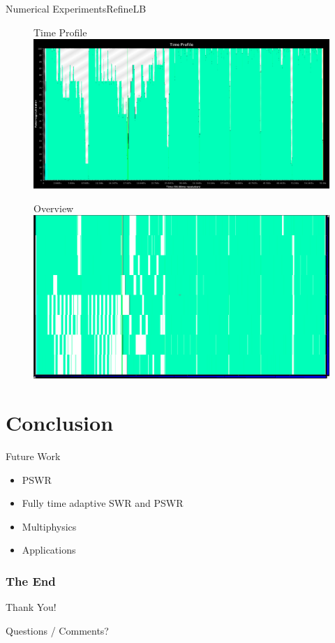 \documentclass[]{beamer}
\begin{document}
\begin{frame}{Numerical Experiments}{RefineLB}
  \begin{figure}{Time Profile}
    \includegraphics[width=.65\paperwidth,height=.35\paperheight]{figures/LoadBalancing/TimeProfileRefineLB}
  \end{figure}
  \begin{figure}{\hspace{15pt}Overview}
    \includegraphics[width=.65\paperwidth,height=.35\paperheight]{figures/LoadBalancing/OverviewRefineLB}
  \end{figure}
\end{frame}


\section{Conclusion}

\begin{frame}{Future Work}

  \begin{itemize}
  \item PSWR
  \item Fully time adaptive SWR and PSWR
  \item Multiphysics
  \item Applications
  \end{itemize}

\end{frame}

\begin{frame}
  \frametitle{The End}
  \begin{center}
    Thank You!

    Questions / Comments?
  \end{center}
\end{frame}
\end{document}
